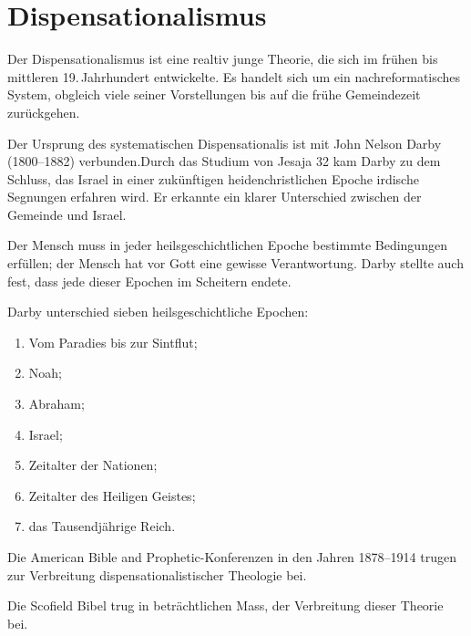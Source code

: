 \documentclass{../../inc/mybib}
\begin{document}
\section{Dispensationalismus}
    Der Dispensationalismus ist eine realtiv junge Theorie, die sich im frühen bis mittleren 19.\,Jahrhundert entwickelte. Es handelt sich um ein nachreformatisches System, obgleich viele seiner Vorstellungen bis auf 
die frühe Gemeindezeit zurückgehen.

Der Ursprung des systematischen Dispensationalis ist mit John Nelson Darby (1800–1882) verbunden.Durch das Studium von Jesaja 32 kam Darby zu dem Schluss, das Israel in einer zukünftigen heidenchristlichen Epoche irdische Segnungen erfahren wird. Er erkannte ein klarer Unterschied zwischen der Gemeinde und Israel.

Der Mensch muss in jeder heilsgeschichtlichen Epoche bestimmte Bedingungen erfüllen; der Mensch hat vor Gott eine gewisse Verantwortung. Darby stellte auch fest, dass jede dieser Epochen im Scheitern endete.

Darby unterschied sieben heilsgeschichtliche Epochen: 
\begin{enumerate}
    \item Vom Paradies bis zur Sintflut;
    \item Noah;
    \item Abraham;
    \item Israel;
    \item Zeitalter der Nationen;
    \item Zeitalter des Heiligen Geistes;
    \item das Tausendjährige Reich.
\end{enumerate}
Die American Bible and Prophetic-Konferenzen in den Jahren 1878–1914 trugen zur Verbreitung dispensationalistischer Theologie bei.

Die Scofield Bibel trug in beträchtlichen Mass, der Verbreitung dieser Theorie bei.
\end{document}
